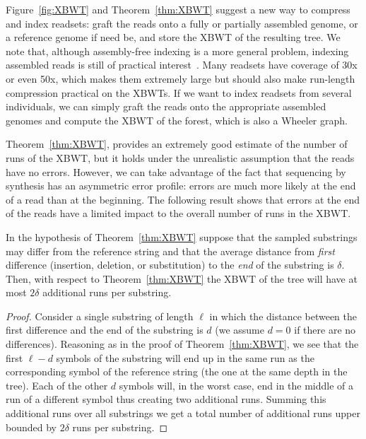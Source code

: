 Figure~\ref{fig:XBWT} and Theorem~\ref{thm:XBWT} suggest a new way to compress and index readsets: graft the reads onto a fully or partially assembled genome, or a reference genome if need be, and store the XBWT of the resulting tree.  We note that, although assembly-free indexing is a more general problem, indexing assembled reads is still of practical interest~\cite{dolle2017using}.  Many readsets have coverage of 30x or even 50x, which makes them extremely large but should also make run-length compression practical on the XBWTs.
If we want to index readsets from several individuals, we can simply graft the reads onto the appropriate assembled genomes and compute the XBWT of the forest, which is also a Wheeler graph.

{Theorem~\ref{thm:XBWT}, provides an extremely good estimate of the number of runs of the XBWT, but it holds under the unrealistic assumption that the reads have no errors. However, we can take advantage of the fact that sequencing by synthesis has an asymmetric error profile: errors are much more likely at the end of a read than at the beginning. The following result shows that errors at the end of the reads have a limited impact to the overall number of runs in the XBWT.}

\begin{theorem}\label{thm:XBWTerr}
{In the hypothesis of Theorem~\ref{thm:XBWT} suppose that the sampled substrings may differ from the reference string and that the average distance from {\em first} difference (insertion, deletion, or substitution) to the {\em end} of the substring is $\delta$. Then, with respect to Theorem~\ref{thm:XBWT} the XBWT of the tree will have at most $2\delta$ additional runs per substring.}
\end{theorem}

\begin{proof}
{Consider a single substring of length $\ell$ in which the distance between the first difference and the end of the substring is $d$ (we assume $d=0$ if there are no differences). Reasoning as in the proof of Theorem~\ref{thm:XBWT}, we see that the first $\ell-d$ symbols of the substring will end up in the same run as the corresponding symbol of the reference string (the one at the same depth in the tree). Each of the other $d$ symbols will, in the worst case, end in the middle of a run of a different symbol thus creating two additional runs. Summing this additional runs over all substrings we get a total number of additional runs upper bounded by $2\delta$ runs per substring.}
\end{proof}

